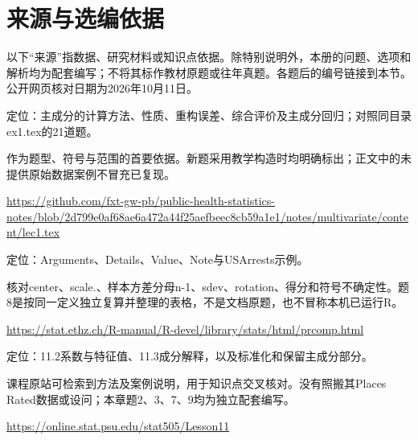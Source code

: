 \chapter*{来源与选编依据}
以下“来源”指数据、研究材料或知识点依据。除特别说明外，本册的问题、选项和解析均为配套编写；不将其标作教材原题或往年真题。各题后的编号链接到本节。公开网页核对日期为2026年10月11日。

\par\noindent\begin{minipage}{\linewidth}\label{src:M1-NOTES}
\par
定位：主成分的计算方法、性质、重构误差、综合评价及主成分回归；对照同目录ex1.tex的21道题。\par
作为题型、符号与范围的首要依据。新题采用教学构造时均明确标出；正文中的未提供原始数据案例不冒充已复现。\par
{\small\url{https://github.com/fxt-gw-pb/public-health-statistics-notes/blob/2d799e0af68ae6a472a44f25aefbeec8cb59a1e1/notes/multivariate/content/lec1.tex}}\par
\end{minipage}\par\medskip

\par\noindent\begin{minipage}{\linewidth}\label{src:M1-PRCOMP}
\par
定位：Arguments、Details、Value、Note与USArrests示例。\par
核对center、scale.、样本方差分母n-1、sdev、rotation、得分和符号不确定性。题8是按同一定义独立复算并整理的表格，不是文档原题，也不冒称本机已运行R。\par
{\small\url{https://stat.ethz.ch/R-manual/R-devel/library/stats/html/prcomp.html}}\par
\end{minipage}\par\medskip

\par\noindent\begin{minipage}{\linewidth}\label{src:M1-PSU-PCA}
\par
定位：11.2系数与特征值、11.3成分解释，以及标准化和保留主成分部分。\par
课程原站可检索到方法及案例说明，用于知识点交叉核对。没有照搬其Places Rated数据或设问；本章题2、3、7、9均为独立配套编写。\par
{\small\url{https://online.stat.psu.edu/stat505/Lesson11}}\par
\end{minipage}\par\medskip

